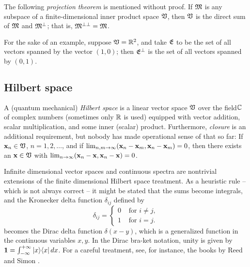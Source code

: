 The following {\em projection theorem}
is mentioned without proof.
If ${\frak M}$ is any subspace of a finite-dimensional inner product space ${\frak V}$,
then ${\frak V}$ is the direct sum of ${\frak M}$ and ${\frak M}^\perp$;
that is, ${\frak M}^{\perp \perp}={\frak M}$.

{
\color{blue}
\bexample
For the sake of an example, suppose ${\frak V}={\Bbb R}^2$,
and take ${\frak E}$ to be the set of all vectors spanned by the vector $(1,0)$;
then ${\frak E}^\perp$ is the set of all vectors spanned by $(0,1)$.
\eexample
}


\subsection{Hilbert space}


A (quantum mechanical) {\em Hilbert space}  is a linear
vector space ${\frak V}$ over the field${\Bbb C}$ of complex numbers
(sometimes only ${\Bbb R}$ is used)
equipped with vector addition, scalar multiplication, and some inner (scalar) product.
Furthermore, {\em closure} is an additional requirement,
but nobody has made operational sense of that so far:
If ${\bf x}_n\in {\frak V}$, $n=1,2,\ldots$, and if $\lim_{n,m\rightarrow
\infty} ({\bf x}_n-{\bf x}_m,{\bf x}_n-{\bf x}_m)=0$,
then there exists an ${\bf x}\in {\frak V}$ with
$\lim_{n\rightarrow \infty} ({\bf x}_n-{\bf x},{\bf x}_n-{\bf x})=0$.





Infinite dimensional vector spaces and continuous spectra are nontrivial
extensions of the finite
dimensional Hilbert space treatment. As a heuristic rule -- which is not
always correct -- it might be
stated that the sums become integrals, and the Kronecker delta function
$\delta_{ij}$ defined by
\begin{equation}
\delta_{ij} =\begin{cases}
0  &\text{ for }i\neq j , \\
1  &\text{ for }i = j.
\end{cases}
\end{equation}
becomes the Dirac delta function $\delta (x-y)$, which is a
generalized function in the continuous variables $x,y$.
In the Dirac bra-ket notation, unity is given by
${\bf 1}=\int_{-\infty}^{+\infty} \vert x\rangle \langle  x\vert \, dx$.
For a careful treatment, see, for instance,
the books by
Reed and Simon \cite{reed-sim1,reed-sim2}.


